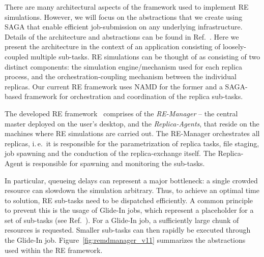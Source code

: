 \documentclass{llncs}
\begin{document}
There are many architectural aspects of the framework used to
implement RE simulations. However, we will focus on the abstractions
that we create using SAGA that enable efficient job-submission on any
underlying infrastructure.  Details of the architecture and
abstractions can be found in
Ref.~\cite{repex_ptrsa,repex_escience08}. Here we present the
architecture in the context of an application consisting of
loosely-coupled multiple sub-tasks. RE simulations can be thought of
as consisting of two distinct components: the simulation
engine/mechanism used for each replica process, and the
orchestration-coupling mechanism between the individual replicas. Our
current RE framework uses NAMD for the former and a SAGA-based
framework for orchestration and coordination of the replica sub-tasks.

The developed RE framework~\cite{repex_escience08} comprises of the
\emph{RE-Manager} -- the central master deployed on the user's
desktop, and the \textit{Replica-Agents}, that reside on the machines
where RE simulations are carried out. The RE-Manager orchestrates all
replicas, i.\,e.\ it is responsible for the parametrization of
replica tasks, file staging, job spawning and the conduction of the
replica-exchange itself.  The Replica-Agent is responsible for
spawning and monitoring the sub-tasks.

In particular, queueing delays can represent a major bottleneck: a
single crowded resource can slowdown the simulation arbitrary. Thus,
to achieve an optimal time to solution, RE sub-tasks need to be
dispatched efficiently.  A common principle to prevent this is the
usage of Glide-In jobs, which represent a placeholder for a set of
sub-tasks (see Ref.~\cite{citeulike:291860}).  For a Glide-In
job, a sufficiently large chunk of resources is requested. Smaller
sub-tasks can then rapidly be executed through the Glide-In job.
Figure~\ref{fig:remdmanager_v11} summarizes the abstractions used
within the RE framework.
\end{document}
